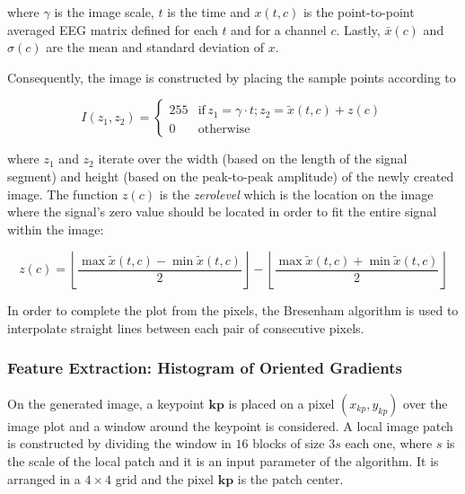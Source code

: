 \documentclass[entropy,article,submit,moreauthors,pdftex,10pt,a4paper]{mdpi}
\begin{document}
\noindent where $\gamma$ is the image scale, $t$ is the time and $ x(t,c) $ is the point-to-point averaged EEG matrix defined for each $t$ and for a channel $c$. Lastly, $\bar{x}(c)$ and $ \sigma (c) $ are the mean and standard deviation of $x$.

Consequently, the image is constructed by placing the sample points according to

\begin{equation}
I(z_1,z_2) = \left\{ \begin{array}{rl}
255 & \text{if} \,  z_1 = \gamma \cdot t; z_2 = \tilde{x}(t,c) + z(c) \\
0   & \mbox{otherwise}
\end{array}\right.
\label{eq:images}
\end{equation}

\noindent where $ z_1$ and $z_2$ iterate over the width (based on the length of the signal segment) and height (based on the peak-to-peak amplitude) of the newly created image.  The function $z(c)$ is the \textit{zerolevel} which is the location on the image where the signal's zero value should be located in order to fit the entire signal within the image:

\begin{equation}
z(c) = \left \lfloor{ \frac{\max \tilde{x}(t,c)  - \min \tilde{x}(t,c) }{2} }\right \rfloor -   \left \lfloor{ \frac{\max \tilde{x}(t,c)  + \min \tilde{x}(t,c)}{ 2} }\right \rfloor
\label{eq:zerolevel}
\end{equation}
  

In order to complete the plot from the pixels, the Bresenham \citep{Bresenham1965,Ramele2016} algorithm is used to interpolate straight lines between each pair of  consecutive pixels.


\subsubsection{Feature Extraction: Histogram of Oriented Gradients}
\label{SIFT}


On the generated image, a keypoint $\mathbf{kp}$ is placed on a pixel $(x_{kp}, y_{kp})$ over the image plot and a window around the keypoint is considered. A local image patch is constructed by dividing the window in $16$ blocks of size $3s$ each one,  where $s$ is the scale of the local patch and it is an input parameter of the algorithm. It is arranged in a $4 \times 4$ grid and the pixel $ \mathbf{kp}$ is the patch center. 
\end{document}
